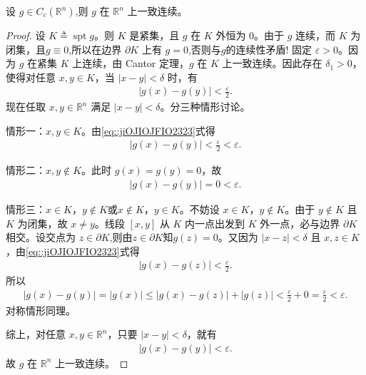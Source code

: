 \documentclass[../../main.tex]{subfiles}%
\begin{document}
\begin{lemma}[紧支集连续函数在全体空间上一致连续]\label{lemma:紧支连续一致连续-9a2b}
设 \(g\in C_c(\mathbb{R}^n)\),则 \(g\) 在 \(\mathbb{R}^n\) 上一致连续。
\end{lemma}
\begin{proof}

设 \(K\triangleq \operatorname{spt} g\)。则 \(K\) 是紧集，且 \(g\) 在 \(K\) 外恒为 \(0\)。由于 \(g\) 连续，而 \(K\) 为闭集，且$g\equiv 0$,所以在边界 \(\partial K\) 上有 \(g=0\),否则与$g$的连续性矛盾!
固定 \(\varepsilon>0\)。因为 \(g\) 在紧集 \(K\) 上连续，由 Cantor 定理，\(g\) 在 \(K\) 上一致连续。因此存在 \(\delta_1>0\)，使得对任意 \(x,y\in K\)，当 \(|x-y|<\delta\) 时，有
\begin{align}\label{eq::jiOJIOJFIO2323}
|g(x)-g(y)|<\frac{\varepsilon}{2}.
\end{align}
现在任取 \(x,y\in\mathbb{R}^n\) 满足 \(|x-y|<\delta\)。分三种情形讨论。

情形一：\(x,y\in K\)。由\eqref{eq::jiOJIOJFIO2323}式得
\begin{align*}
|g(x)-g(y)|<\frac{\varepsilon}{2}<\varepsilon.
\end{align*}

情形二：\(x,y\notin K\)。此时 \(g(x)=g(y)=0\)，故
\begin{align*}
|g(x)-g(y)|=0<\varepsilon.
\end{align*}

情形三：\(x\in K\)，\(y\notin K\)或\(x\notin K\)，\(y\in K\)。不妨设 \(x\in K\)，\(y\notin K\)。由于 \(y\notin K\) 且 \(K\) 为闭集，故 \(x\neq y\)。线段 \([x,y]\) 从 \(K\) 内一点出发到 \(K\) 外一点，必与边界 \(\partial K\) 相交。设交点为 \(z\in\partial K\),则由\(z\in\partial K\)知\(g(z)=0\)。又因为 \(|x-z|<\delta\) 且 \(x,z\in K\)，由\eqref{eq::jiOJIOJFIO2323}式得
\begin{align*}
|g(x)-g(z)|<\frac{\varepsilon}{2}.
\end{align*}
所以
\begin{align*}
|g(x)-g(y)|=|g(x)|\leqslant |g(x)-g(z)|+|g(z)|<\frac{\varepsilon}{2}+0=\frac{\varepsilon}{2}<\varepsilon.
\end{align*}
对称情形同理。

综上，对任意 \(x,y\in\mathbb{R}^n\)，只要 \(|x-y|<\delta\)，就有
\begin{align*}
|g(x)-g(y)|<\varepsilon.
\end{align*}
故 \(g\) 在 \(\mathbb{R}^n\) 上一致连续。
\end{proof}
\end{document}
